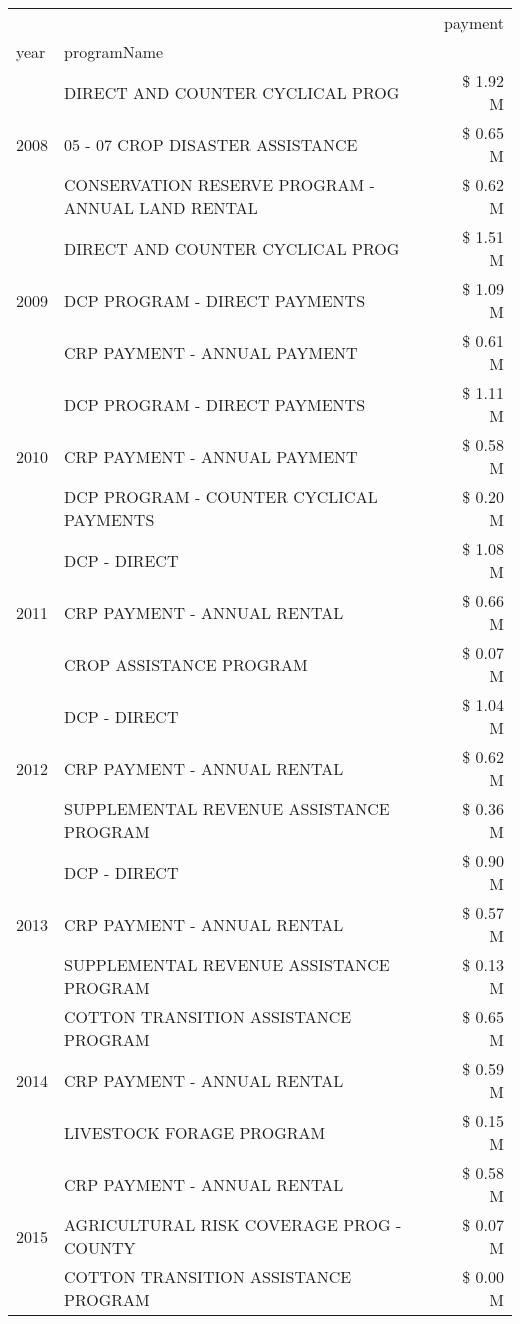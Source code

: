 \begin{tabular}{llr}
\toprule
 &  & payment \\
year & programName &  \\
\midrule
\multirow[t]{3}{*}{2008} & DIRECT AND COUNTER CYCLICAL PROG & \$ 1.92 M \\
 & 05 - 07 CROP DISASTER ASSISTANCE & \$ 0.65 M \\
 & CONSERVATION RESERVE PROGRAM - ANNUAL LAND RENTAL & \$ 0.62 M \\
\cline{1-3}
\multirow[t]{3}{*}{2009} & DIRECT AND COUNTER CYCLICAL PROG & \$ 1.51 M \\
 & DCP PROGRAM - DIRECT PAYMENTS & \$ 1.09 M \\
 & CRP PAYMENT - ANNUAL PAYMENT & \$ 0.61 M \\
\cline{1-3}
\multirow[t]{3}{*}{2010} & DCP PROGRAM - DIRECT PAYMENTS & \$ 1.11 M \\
 & CRP PAYMENT - ANNUAL PAYMENT & \$ 0.58 M \\
 & DCP PROGRAM - COUNTER CYCLICAL PAYMENTS & \$ 0.20 M \\
\cline{1-3}
\multirow[t]{3}{*}{2011} & DCP - DIRECT & \$ 1.08 M \\
 & CRP PAYMENT - ANNUAL RENTAL & \$ 0.66 M \\
 & CROP ASSISTANCE PROGRAM & \$ 0.07 M \\
\cline{1-3}
\multirow[t]{3}{*}{2012} & DCP - DIRECT & \$ 1.04 M \\
 & CRP PAYMENT - ANNUAL RENTAL & \$ 0.62 M \\
 & SUPPLEMENTAL REVENUE ASSISTANCE PROGRAM & \$ 0.36 M \\
\cline{1-3}
\multirow[t]{3}{*}{2013} & DCP - DIRECT & \$ 0.90 M \\
 & CRP PAYMENT - ANNUAL RENTAL & \$ 0.57 M \\
 & SUPPLEMENTAL REVENUE ASSISTANCE PROGRAM & \$ 0.13 M \\
\cline{1-3}
\multirow[t]{3}{*}{2014} & COTTON TRANSITION ASSISTANCE PROGRAM & \$ 0.65 M \\
 & CRP PAYMENT - ANNUAL RENTAL & \$ 0.59 M \\
 & LIVESTOCK FORAGE PROGRAM & \$ 0.15 M \\
\cline{1-3}
\multirow[t]{3}{*}{2015} & CRP PAYMENT - ANNUAL RENTAL & \$ 0.58 M \\
 & AGRICULTURAL RISK COVERAGE PROG - COUNTY & \$ 0.07 M \\
 & COTTON TRANSITION ASSISTANCE PROGRAM & \$ 0.00 M \\
\cline{1-3}

\end{tabular}
